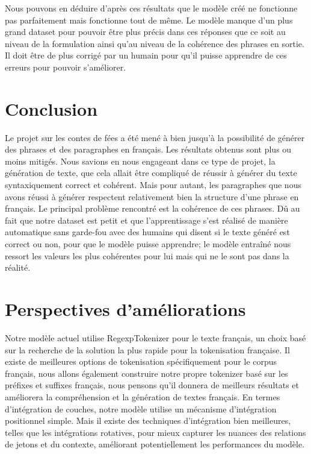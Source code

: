 \documentclass{rapport}
\begin{document}
        Nous pouvons en déduire d'après ces résultats que le modèle créé ne fonctionne pas parfaitement mais fonctionne tout de même. Le modèle manque d'un plus grand dataset pour pouvoir être plus précis dans ces réponses que ce soit au niveau de la formulation ainsi qu'au niveau de la cohérence des phrases en sortie. Il doit être de plus corrigé par un humain pour qu'il puisse apprendre de ces erreurs pour pouvoir s'améliorer.

    \clearpage

    \section{Conclusion}

        Le projet sur les contes de fées a été mené à bien jusqu'à la possibilité de générer des phrases et des paragraphes en français. Les résultats obtenus sont plus ou moins mitigés. Nous savions en nous engageant dans ce type de projet, la génération de texte, que cela allait être compliqué de réussir à générer du texte syntaxiquement correct et cohérent. Mais pour autant, les paragraphes que nous avons réussi à générer respectent relativement bien la structure d'une phrase en français. Le principal problème rencontré est la cohérence de ces phrases. Dû au fait que notre dataset est petit et que l'apprentissage s'est réalisé de manière automatique sans garde-fou avec des humains qui disent si le texte généré est correct ou non, pour que le modèle puisse apprendre; le modèle entraîné nous ressort les valeurs les plus cohérentes pour lui mais qui ne le sont pas dans la réalité.

    \clearpage

    \section{Perspectives d'améliorations}
    
        Notre modèle actuel utilise RegexpTokenizer pour le texte français, un choix basé sur la recherche de la solution la plus rapide pour la tokenisation française. Il existe de meilleures options de tokenisation spécifiquement pour le corpus français, nous allons également construire notre propre tokenizer basé sur les préfixes et suffixes français, nous pensons qu'il donnera de meilleurs résultats et améliorera la compréhension et la génération de textes français.
        En termes d'intégration de couches, notre modèle utilise un mécanisme d'intégration positionnel simple. Mais il existe des techniques d'intégration bien meilleures, telles que les intégrations rotatives, pour mieux capturer les nuances des relations de jetons et du contexte, améliorant potentiellement les performances du modèle.
        
\end{document}
